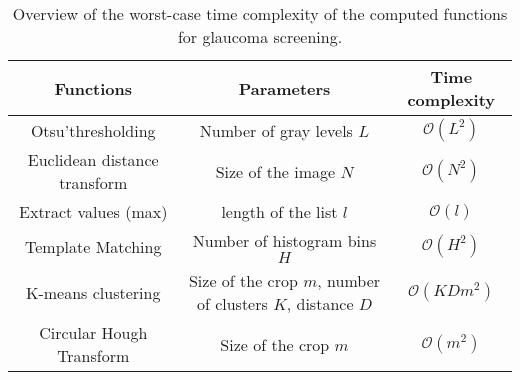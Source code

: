 \begin{table}[h]
	\begin{center}
		\small
		
		\renewcommand{\arraystretch}{1}
	
		\begin{tabular}{c c c}
			\hline 
			Functions & Parameters & Time complexity \\
			\hline
			Otsu'thresholding & Number of gray levels $L$ & $\mathcal{O}(L^2)$ \\
			Euclidean distance transform & Size of the image $N$ & $\mathcal{O}(N^2)$ \\
			Extract values (max) & length of the list $l$ & $\mathcal{O}(l)$ \\
			Template Matching & Number of histogram bins $H$ & $\mathcal{O}(H^2)$ \\
			
			K-means clustering & Size of the crop $m$, number of clusters $K$, distance $D$ & $\mathcal{O}(KDm^2)$ \\
			Circular Hough Transform & Size of the crop $m$ & $\mathcal{O}(m^2)$ \\
			
			\hline
			
		\end{tabular}
		
	\end{center}
	\caption{\label{complexity}Overview of the worst-case time complexity of the computed functions for glaucoma screening.}
\end{table}